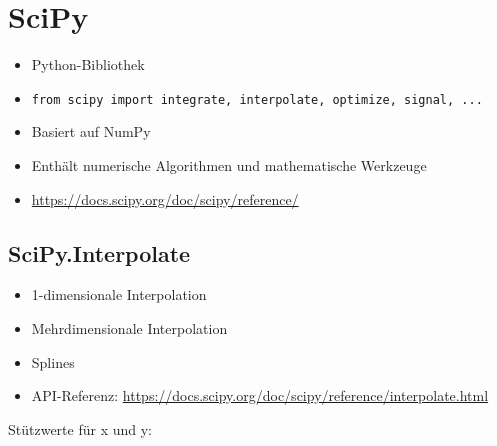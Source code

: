 \section{SciPy}
\begin{itemize}
	\item Python-Bibliothek
	\item[\-] \texttt{from scipy import integrate, interpolate, optimize, signal, ...}
	\item Basiert auf NumPy
	\item Enthält numerische Algorithmen und mathematische Werkzeuge\\
	\item \url{https://docs.scipy.org/doc/scipy/reference/}
\end{itemize}

\begin{minipage}[t]{0.49\textwidth}
	\subsection{SciPy.Interpolate}
	\begin{itemize}
		\item 1-dimensionale Interpolation
		\item Mehrdimensionale Interpolation
		\item Splines
		\item API-Referenz: \url{https://docs.scipy.org/doc/scipy/reference/interpolate.html}
	\end{itemize}
\end{minipage}
\hspace{0.02\textwidth}
\begin{minipage}[t]{0.49\textwidth}
	
	Stützwerte für x und y:
	
\end{minipage}\\[12pt]

